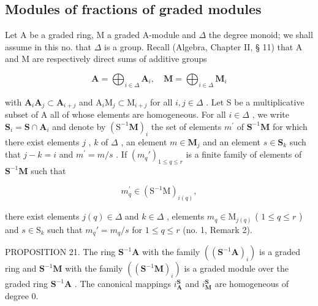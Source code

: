 \subsection{Modules of fractions of graded modules}

Let A be a graded ring, M a graded A-module and \(\Delta\) the degree monoid; we shall assume in this no. that \(\Delta\) is a group. Recall (Algebra, Chapter II, § 11) that A and M are respectively direct sums of additive groups

\[
\mathbf {A} = \bigoplus_ {i \in \Delta} \mathbf {A} _ {i}, \quad \mathbf {M} = \bigoplus_ {i \in \Delta} \mathbf {M} _ {i}
\]

with \(\mathbf{A}_i\mathbf{A}_j\subset \mathbf{A}_{i + j}\) and \(\mathrm{A}_i\mathrm{M}_j\subset \mathrm{M}_{i + j}\) for all \(i,j\in \Delta\) . Let S be a multiplicative subset of A all of whose elements are homogeneous. For all \(i\in \Delta\) , we write \(\mathbf{S}_i = \mathbf{S}\cap \mathbf{A}_i\) and denote by \((\mathrm{S}^{-1}\mathbf{M})_i\) the set of elements \(m^{\prime}\) of \(\mathbf{S}^{-1}\mathbf{M}\) for which there exist elements \(j\) , \(k\) of \(\Delta\) , an element \(m\in \mathbf{M}_j\) and an element \(s\in \mathbf{S}_k\) such that \(j - k = i\) and \(m^{\prime} = m / s\) . If \((m_q')_{1\leqslant q\leqslant r}\) is a finite family of elements of \(\mathbf{S}^{-1}\mathbf{M}\) such that

\[
m _ {q} ^ {\prime} \in (\mathrm{S} ^ {- 1} \mathrm{M}) _ {i (q)},
\]

there exist elements \(j(q) \in \Delta\) and \(k \in \Delta\) , elements \(m_q \in \mathrm{M}_{j(q)}\) ( \(1 \leqslant q \leqslant r\) ) and \(s \in \mathrm{S}_k\) such that \(m_q' = m_q / s\) for \(1 \leqslant q \leqslant r\) (no. 1, Remark 2).

PROPOSITION 21. The ring \(\mathbf{S}^{-1}\mathbf{A}\) with the family \(((\mathbf{S}^{-1}\mathbf{A})_i)\) is a graded ring and \(\mathbf{S}^{-1}\mathbf{M}\) with the family \(((\mathbf{S}^{-1}\mathbf{M})_i)\) is a graded module over the graded ring \(\mathbf{S}^{-1}\mathbf{A}\) . The canonical mappings \(i_{\mathbf{A}}^{\mathbf{S}}\) and \(i_{\mathbf{M}}^{\mathbf{S}}\) are homogeneous of degree 0.

